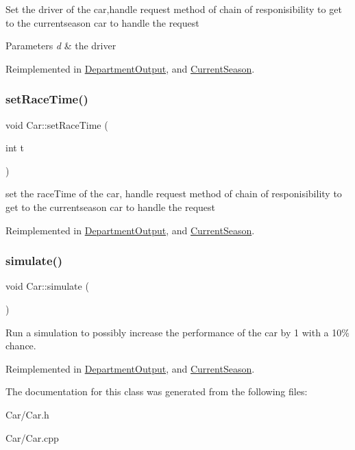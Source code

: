 Set the driver of the car,handle request method of chain of responisibility to get to the currentseason car to handle the request 
\begin{DoxyParams}{Parameters}
{\em d} & the driver \\
\hline
\end{DoxyParams}


Reimplemented in \hyperlink{classDepartmentOutput_aa045362e5763d57a2c888b98c677773c}{Department\+Output}, and \hyperlink{classCurrentSeason_a3ea9de8713c6d2c21202351b036af75f}{Current\+Season}.

\mbox{\label{classCar_a72a79de673e860c1f177791bee87c529}} 
\subsubsection{\texorpdfstring{set\+Race\+Time()}{setRaceTime()}}
{\footnotesize\ttfamily void Car\+::set\+Race\+Time (\begin{DoxyParamCaption}\item[{int}]{t }\end{DoxyParamCaption})\hspace{0.3cm}{\ttfamily [virtual]}}

set the race\+Time of the car, handle request method of chain of responisibility to get to the currentseason car to handle the request 

Reimplemented in \hyperlink{classDepartmentOutput_a99c1b2cf729b25bc2f1d48214019c678}{Department\+Output}, and \hyperlink{classCurrentSeason_aae01cbd64006ce4fe60ea337b4f02962}{Current\+Season}.

\mbox{\label{classCar_af2532d9bbcda730f936f9633d8ee8d71}} 
\subsubsection{\texorpdfstring{simulate()}{simulate()}}
{\footnotesize\ttfamily void Car\+::simulate (\begin{DoxyParamCaption}{ }\end{DoxyParamCaption})\hspace{0.3cm}{\ttfamily [virtual]}}

Run a simulation to possibly increase the performance of the car by 1 with a 10\% chance. 

Reimplemented in \hyperlink{classDepartmentOutput_a3c189e28c9d8899afafe3d6ee7d7602d}{Department\+Output}, and \hyperlink{classCurrentSeason_a4828aaa2c0b914b55ebb34c0d1062e8e}{Current\+Season}.



The documentation for this class was generated from the following files\+:\begin{DoxyCompactItemize}
\item 
Car/Car.\+h\item 
Car/Car.\+cpp\end{DoxyCompactItemize}
